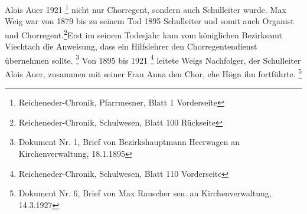 Alois Auer 1921 \footnote{Reicheneder-Chronik, Pfarrmesner, Blatt 1
Vorderseite} nicht nur Chorregent, sondern
auch Schulleiter wurde. Max Weig war von 1879 bis zu seinem Tod 1895
Schulleiter und somit auch Organist und Chorregent.\footnote{
Reicheneder-Chronik, Schulwesen, Blatt 100
Rückseite}Erst im seinem Todesjahr kam vom
königlichen Bezirksamt Viechtach die Anweisung, dass ein Hilfslehrer
den Chorregentendienst übernehmen sollte. \footnote{Dokument Nr. 1,
Brief von Bezirkshauptmann Heerwagen an Kirchenverwaltung, 18.1.1895}
Von 1895 bis 1921 \footnote{Reicheneder-Chronik, Schulwesen, Blatt 110
Vorderseite} leitete Weigs Nachfolger, der Schulleiter Alois Auer,
zusammen mit seiner Frau Anna den Chor, ehe Högn ihn
fortführte. \footnote{Dokument Nr. 6, Brief von Max Rauscher sen. an
Kirchenverwaltung, 14.3.1927}

